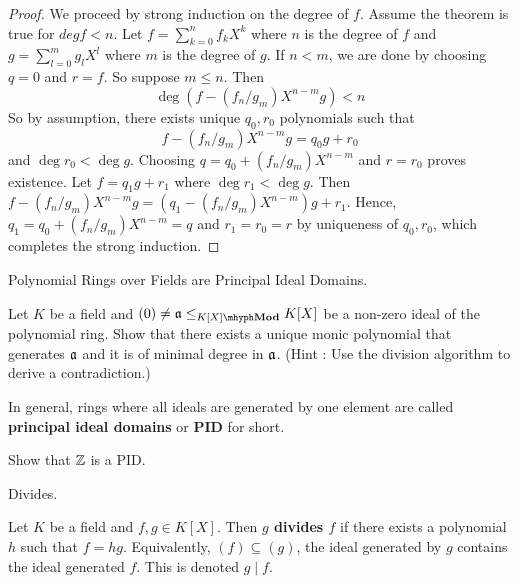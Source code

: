 \documentclass[../book.tex]{subfiles}
\begin{document}
\begin{proof}
    We proceed by strong induction on the degree of $f$. 
    Assume the theorem is true for $deg f < n$.
    Let $f = \sum_{k = 0}^{n} f_k X^k$ where $n$ is the degree of $f$
    and $g = \sum_{l = 0}^m g_l X^l$ where $m$ is the degree of $g$. 
    If $n < m$, we are done by choosing $q = 0$ and $r = f$.
    So suppose $m \leq n$. 
    Then \[
        \deg (f - (f_n/g_m)X^{n-m} g) < n
    \]
    So by assumption, there exists unique $q_0, r_0$ polynomials such that 
    \[f - (f_n/g_m)X^{n-m} g = q_0 g + r_0\] and $\deg r_0 < \deg g$. 
    Choosing $q = q_0 + (f_n/g_m)X^{n-m}$ and $r = r_0$ proves existence.
    Let $f = q_1 g + r_1$ where $\deg r_1 < \deg g$. 
    Then $f - (f_n/g_m)X^{n-m}g = (q_1 - (f_n/g_m)X^{n-m}) g + r_1$.
    Hence, $q_1 = q_0 + (f_n/g_m)X^{n-m} = q$ 
    and $r_1 = r_0 = r$ by uniqueness of $q_0, r_0$,
    which completes the strong induction. 
\end{proof}

\begin{ex} Polynomial Rings over Fields are Principal Ideal Domains. 
    
    Let $K$ be a field and $(0) \neq \fa \leq_{\mod{K[X]}} K[X]$ be a non-zero ideal 
    of the polynomial ring. 
    Show that there exists a unique monic polynomial that generates $\mathfrak{a}$
    and it is of minimal degree in $\mathfrak{a}$. 
    (Hint : Use the division algorithm to derive a contradiction.)
    
    In general, rings where all ideals are generated by one element
    are called \textbf{principal ideal domains} or \textbf{PID} for short.
\end{ex}
\begin{ex}
    Show that $\mathbb{Z}$ is a PID. 
\end{ex}
\begin{dfn} Divides.
    
    Let $K$ be a field and $f, g \in K[X]$.
    Then \textbf{$g$ divides $f$} if there exists a polynomial $h$
    such that $f = hg$. 
    Equivalently, $(f) \subseteq (g)$,
    the ideal generated by $g$ contains the ideal generated $f$.
    This is denoted $g \mid f$. 
\end{dfn}
\end{document}
